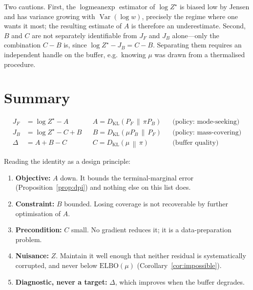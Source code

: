 \documentclass[11pt]{article}
\theoremstyle{plain}
\theoremstyle{definition}
\theoremstyle{remark}
\newcommand{\KL}[2]{D_{\mathrm{KL}}\!\left(#1 \,\middle\|\, #2\right)}
\newcommand{\PF}{P_{F}}
\newcommand{\PB}{P_{B}}
\newcommand{\Zstar}{Z^{\star}}
\newcommand{\JF}{J_{F}}
\newcommand{\JB}{J_{B}}
\begin{document}
\noindent
Two cautions. First, the $\operatorname{logmeanexp}$ estimator of $\log\Zstar$ is
biased low by Jensen and has variance growing with $\operatorname{Var}(\log w)$,
precisely the regime where one wants it most; the resulting estimate of $A$ is
therefore an underestimate. Second, $B$ and $C$ are not separately identifiable
from $\JF$ and $\JB$ alone---only the combination $C - B$ is, since
$\log\Zstar - \JB = C - B$. Separating them requires an independent handle on the
buffer, e.g.\ knowing $\mu$ was drawn from a thermalised procedure.

\section{Summary}

\begin{align*}
  \JF &= \log\Zstar - A                 && A = \KL{\PF}{\pi\PB} && \text{(policy: mode-seeking)}\\
  \JB &= \log\Zstar - C + B             && B = \KL{\mu\PB}{\PF} && \text{(policy: mass-covering)}\\
  \Delta &= A + B - C                   && C = \KL{\mu}{\pi}    && \text{(buffer quality)}
\end{align*}

\noindent
Reading the identity as a design principle:
\begin{enumerate}
  \item \textbf{Objective:} $A$ down. It bounds the terminal-marginal error
        (Proposition~\ref{prop:dpi}) and nothing else on this list does.
  \item \textbf{Constraint:} $B$ bounded. Losing coverage is not recoverable by
        further optimisation of $A$.
  \item \textbf{Precondition:} $C$ small. No gradient reduces it; it is a
        data-preparation problem.
  \item \textbf{Nuisance:} $Z$. Maintain it well enough that neither residual is
        systematically corrupted, and never below $\mathrm{ELBO}(\mu)$
        (Corollary~\ref{cor:impossible}).
  \item \textbf{Diagnostic, never a target:} $\Delta$, which improves when the
        buffer degrades.
\end{enumerate}
\end{document}
